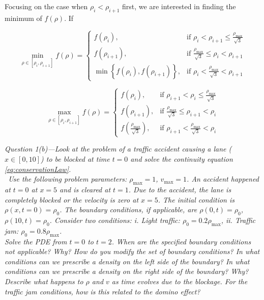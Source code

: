 \documentclass[11pt]{article}
\newcommand{\forceindent}{\leavevmode{\parindent=1em\indent}}
\begin{document}
Focusing on the case when $\rho_i < \rho_{i+1}$ first, we are interested in finding the minimum of $f(\rho)$. If 

\begin{equation}
\min_{\rho \in \left[\rho_i, \rho_{i+1}\right]} f(\rho) =
\begin{cases}
  f(\rho_i),&
    \text{if } \rho_i < \rho_{i+1} \le \frac{\rho_\mathrm{max}}{\sqrt{3}} \\
  f(\rho_{i+1}),&
    \text{if } \frac{\rho_\mathrm{max}}{\sqrt{3}} \le \rho_i < \rho_{i+1} \\
  \min\left\{ f(\rho_i), f(\rho_{i+1}) \right\} ,&
    \text{if } \rho_i < \frac{\rho_\mathrm{max}}{\sqrt{3}} < \rho_{i+1}
\end{cases}
\end{equation}

\begin{equation}
\max_{\rho \in \left[\rho_i, \rho_{i+1}\right]} f(\rho) =
\begin{cases}
  f(\rho_i),&
    \text{if } \rho_{i+1} < \rho_i \le \frac{\rho_\mathrm{max}}{\sqrt{3}} \\
  f(\rho_{i+1}),&
    \text{if } \frac{\rho_\mathrm{max}}{\sqrt{3}} \le \rho_{i+1} < \rho_i \\
  f\left( \frac{\rho_\mathrm{max}}{\sqrt{3}} \right) ,&
  \text{if } \rho_{i+1} < \frac{\rho_\mathrm{max}}{\sqrt{3}} < \rho_i
\end{cases}
\end{equation}

\begin{tcolorbox}
  \textit{Question 1(b)---Look at the problem of a traffic accident causing a lane ($x \in [0, 10]$) to be blocked at time $t = 0$ and solve the continuity equation \eqref{eq:conservationLaw}. \\
  \forceindent~Use the following problem parameters: $\rho_\mathrm{max}=1$, $v_\mathrm{max} = 1$. An accident happened at $t = 0$ at $x = 5$ and is cleared at $t = 1$. Due to the accident, the lane is completely blocked or the velocity is zero at $x = 5$. The initial condition is $\rho(x, t = 0) = \rho_0$. The boundary conditions, if applicable, are $\rho(0, t) = \rho_0$, $\rho(10, t) = \rho_0$. Consider two conditions: \textit{i.} Light traffic: $\rho_0 = 0.2 \rho_\mathrm{max}$, \textit{ii.} Traffic jam: $\rho_0 = 0.8 \rho_\mathrm{max}$. \\
  \forceindent Solve the PDE from $t = 0$ to $t = 2$. When are the specified boundary conditions not applicable? Why? How do you modify the set of boundary conditions? In what conditions can we prescribe a density on the left side of the boundary? In what conditions can we prescribe a density on the right side of the boundary? Why? Describe what happens to $\rho$ and $v$ as time evolves due to the blockage. For the traffic jam conditions, how is this related to the domino effect?}
\end{tcolorbox}
\end{document}
